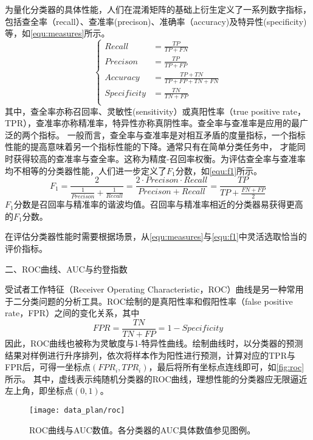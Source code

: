为量化分类器的具体性能，人们在混淆矩阵的基础上衍生定义了一系列数字指标，包括查全率（recall）、查准率(precison)、准确率（accuracy)及特异性(specificity)等，如\autoref{equ:measures}所示。
\begin{equation}
      \label{equ:measures}
      \left \{
      \begin{aligned}
            Recall      &=\frac{TP}{TP+FN}         \\
            Precison    &=\frac{TP}{TP+FP}          \\
            Accuracy    &=\frac{TP+TN}{TP+FP+TN+FN} \\
            Specificity &=\frac{TN}{TN+FP}       \\
      \end{aligned}
      \right.
\end{equation}
其中，查全率亦称召回率、灵敏性(sensitivity）或真阳性率（true positive rate，TPR），查准率亦称精准率，特异性亦称真阴性率。查全率与查准率是应用的最广泛的两个指标\cite{Zhou2016,Aurélien2018}。
一般而言，查全率与查准率是对相互矛盾的度量指标，一个指标性能的提高意味着另一个指标性能的下降。通常只有在简单分类任务中，
才能同时获得较高的查准率与查全率。这称为精度-召回率权衡。为评估查全率与查准率均不相等的分类器性能，人们进一步定义了$F_1\text{分数}$，如\autoref{equ:f1}所示。
\begin{equation}
      \label{equ:f1}
      F_1=\frac{2}{\frac{1}{Precison}+\frac{1}{Recall}}=\frac{2\cdot Precison\cdot Recall}{Precison+Recall}=\frac{TP}{TP+\frac{FN+FP}{2}}
\end{equation}
$F_1\text{分数}$是召回率与精准率的谐波均值。召回率与精准率相近的分类器易获得更高的$F_1\text{分数}$。

在评估分类器性能时需要根据场景，从\autoref{equ:measures}与\autoref{equ:f1}中灵活选取恰当的评价指标。

二、ROC曲线、AUC与约登指数

受试者工作特征（Receiver Operating Characteristic，ROC）曲线是另一种常用于二分类问题的分析工具。ROC绘制的是真阳性率和假阳性率（false positive rate，FPR）之间的变化关系，其中
\begin{equation}
      \label{equ:fpr}
      FPR=\frac{TN}{TN+FP}=1-Specificity
\end{equation}
因此，ROC曲线也被称为灵敏度与1-特异性曲线。绘制曲线时，以分类器的预测结果对样例进行升序排列，依次将样本作为阳性进行预测，计算对应的TPR与FPR后，可得一坐标点$({FPR}_i,{TPR}_i)$，最后将所有坐标点连线即可，如\autoref{fig:roc}所示。
其中，虚线表示纯随机分类器的ROC曲线，理想性能的分类器应无限逼近左上角，即坐标点$(0,1)$。
\begin{figure}[htbp]
      \centering
      \texttt{[image: data\_plan/roc]}
      \caption[ROC曲线与AUC数值]{\label{fig:roc}ROC曲线与AUC数值。各分类器的AUC具体数值参见图例。}
\end{figure}

